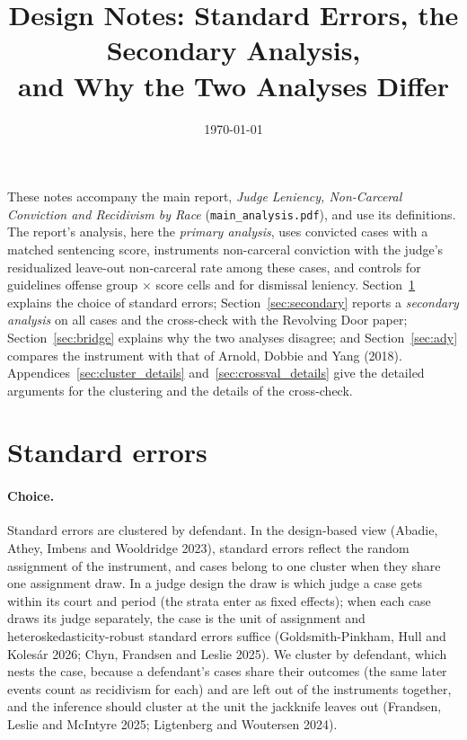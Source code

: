 \documentclass[11pt]{article}
\title{Design Notes: Standard Errors, the Secondary Analysis,\\ and Why the Two Analyses Differ}
\date{\today}
\begin{document}
\maketitle

\noindent These notes accompany the main report, \emph{Judge Leniency, Non-Carceral Conviction and Recidivism by Race} (\texttt{main\_analysis.pdf}), and use its definitions. The report's analysis, here the \emph{primary analysis}, uses convicted cases with a matched sentencing score, instruments non-carceral conviction with the judge's residualized leave-out non-carceral rate among these cases, and controls for guidelines offense group $\times$ score cells and for dismissal leniency. Section~\ref{sec:inference} explains the choice of standard errors; Section~\ref{sec:secondary} reports a \emph{secondary analysis} on all cases and the cross-check with the Revolving Door paper; Section~\ref{sec:bridge} explains why the two analyses disagree; and Section~\ref{sec:ady} compares the instrument with that of Arnold, Dobbie and Yang (2018). Appendices~\ref{sec:cluster_details} and~\ref{sec:crossval_details} give the detailed arguments for the clustering and the details of the cross-check.

\section{Standard errors}\label{sec:inference}

\paragraph{Choice.} Standard errors are clustered by defendant. In the design-based view (Abadie, Athey, Imbens and Wooldridge 2023), standard errors reflect the random assignment of the instrument, and cases belong to one cluster when they share one assignment draw. In a judge design the draw is which judge a case gets within its court and period (the strata enter as fixed effects); when each case draws its judge separately, the case is the unit of assignment and heteroskedasticity-robust standard errors suffice (Goldsmith-Pinkham, Hull and Kolesár 2026; Chyn, Frandsen and Leslie 2025). We cluster by defendant, which nests the case, because a defendant's cases share their outcomes (the same later events count as recidivism for each) and are left out of the instruments together, and the inference should cluster at the unit the jackknife leaves out (Frandsen, Leslie and McIntyre 2025; Ligtenberg and Woutersen 2024).
\end{document}
